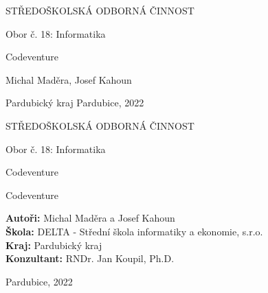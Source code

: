 \begin{titlepage}
    \bfseries{
        \begin{center}
            \LARGE{STŘEDOŠKOLSKÁ ODBORNÁ ČINNOST}

            \vspace{14pt}
            \large{
                Obor č. 18: Informatika
            }

            \vspace{0.4 \textheight}

            \LARGE{
			Codeventure
            }

            \vspace{0.4\textheight}
        \end{center}
        
        \noindent\Large{Michal Maděra, Josef Kahoun}

        \noindent\Large{Pardubický kraj   Pardubice, 2022}
        
            
    }
\end{titlepage}

\cleardoublepage

{\bfseries
    \begin{center}
        \LARGE{STŘEDOŠKOLSKÁ ODBORNÁ ČINNOST}

        \vspace{14pt}
        {\large
            Obor č. 18: Informatika
        }

        \vspace{0.3 \textheight}

        \LARGE{
        Codeventure
        }

        \LARGE{
        Codeventure
        }

        \vspace{0.24\textheight}
    \end{center}  
}
{\Large
    \noindent\textbf{Autoři:} Michal Maděra a Josef Kahoun\\
    \textbf{Škola:} DELTA - Střední škola informatiky a ekonomie, s.r.o.\\
    \textbf{Kraj:} Pardubický kraj\\
    \textbf{Konzultant:} RNDr. Jan Koupil, Ph.D.\\
}

\noindent Pardubice, 2022

\cleardoublepage


